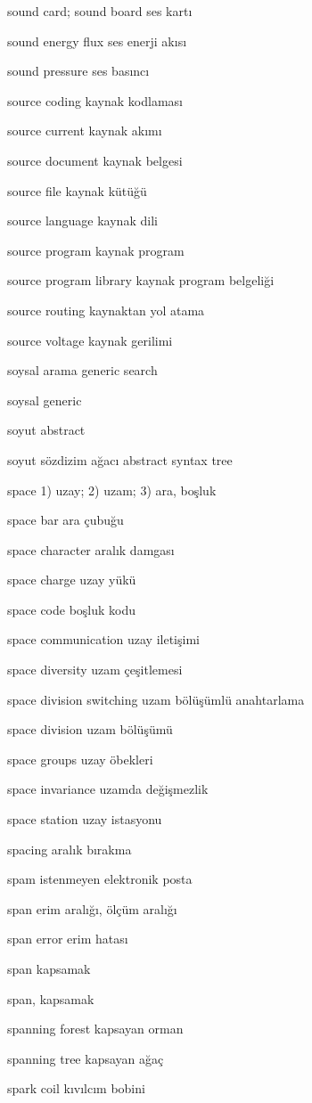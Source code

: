 \documentclass[12pt,fleqn]{article}\usepackage{../../common}
\begin{document}
sound card; sound board ses kartı

sound energy flux ses enerji akısı

sound pressure ses basıncı

source coding kaynak kodlaması

source current kaynak akımı

source document kaynak belgesi

source file kaynak kütüğü

source language kaynak dili

source program kaynak program

source program library kaynak program belgeliği

source routing kaynaktan yol atama

source voltage kaynak gerilimi

soysal arama generic search

soysal generic

soyut abstract

soyut sözdizim ağacı abstract syntax tree

space 1) uzay; 2) uzam; 3) ara, boşluk

space bar ara çubuğu

space character aralık damgası

space charge uzay yükü

space code boşluk kodu

space communication uzay iletişimi

space diversity uzam çeşitlemesi

space division switching uzam bölüşümlü anahtarlama

space division uzam bölüşümü

space groups uzay öbekleri

space invariance uzamda değişmezlik

space station uzay istasyonu

spacing aralık bırakma

spam istenmeyen elektronik posta

span erim aralığı, ölçüm aralığı

span error erim hatası

span kapsamak

span, kapsamak

spanning forest kapsayan orman

spanning tree kapsayan ağaç

spark coil kıvılcım bobini
\end{document}
